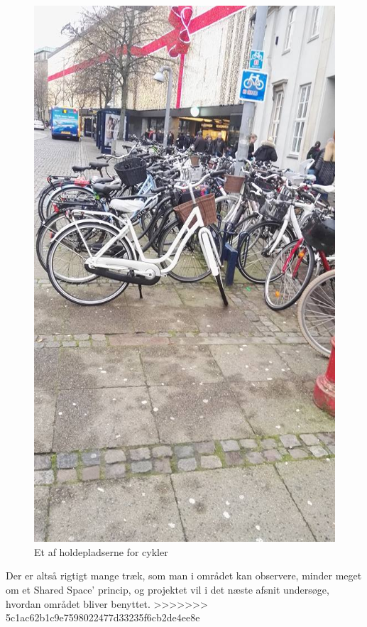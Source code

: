 \begin{figure}[htbp]
   \centering
   \begin{adjustbox}{max width=\textwidth}
     \includegraphics[scale=0.5]{figures/Billederogfigur/cykelstativ.jpg}
  \end{adjustbox}
   \caption{Et af holdepladserne for cykler}
    \label{fig:cykelstativ}
 \end{figure}
Der er altså rigtigt mange træk, som man i området kan observere, minder meget om et Shared Space’ princip, og projektet vil i det næste afsnit undersøge, hvordan området bliver benyttet.
>>>>>>> 5c1ac62b1c9e7598022477d33235f6cb2de4ee8e


